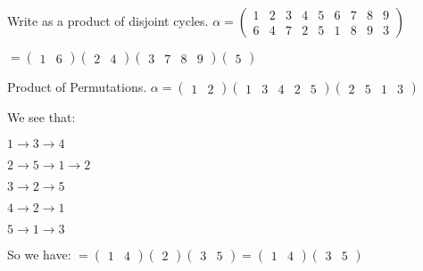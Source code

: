 \begin{ex}  Write as a product of disjoint cycles.
	$\alpha = \left( \begin{matrix}
	1&2&3&4&5&6&7&8&9\\
	6&4&7&2&5&1&8&9&3
	\end{matrix} \right)$
	
	$= \left( \begin{matrix}
	1&6
	\end{matrix} \right)
	\left( \begin{matrix}
	2&4
	\end{matrix} \right)
	\left( \begin{matrix}
	3&7&8&9
	\end{matrix} \right)
	\left( \begin{matrix}
	5
	\end{matrix} \right)$
\end{ex}

\begin{ex}
	Product of Permutations.
	$\alpha= \left( \begin{matrix}
	1&2
	\end{matrix} \right)
	\left( \begin{matrix}
	1&3&4&2&5
	\end{matrix} \right)
	\left( \begin{matrix}
	2&5&1&3
	\end{matrix} \right)$
	
	We see that:
	
	$1 \rightarrow 3 \rightarrow 4$
	
	$2 \rightarrow 5 \rightarrow 1 \rightarrow 2$
	
	$3 \rightarrow 2 \rightarrow 5$
	
	$4 \rightarrow 2 \rightarrow 1$
	
	$5 \rightarrow 1 \rightarrow 3$
	
	So we have:
	$= \left( \begin{matrix}
	1&4
	\end{matrix} \right)
	\left( \begin{matrix}
	2
	\end{matrix} \right)
	\left( \begin{matrix}
	3&5
	\end{matrix} \right) =
	\left( \begin{matrix}
	1&4
	\end{matrix} \right)
	\left( \begin{matrix}
	3&5
	\end{matrix} \right)$
\end{ex}

